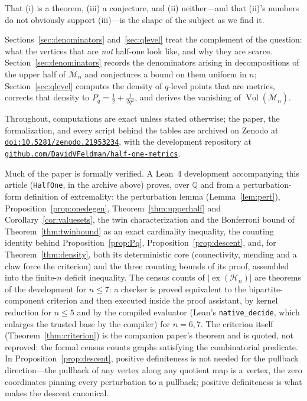 \documentclass[11pt]{article}
\theoremstyle{definition}
\theoremstyle{remark}
\newcommand{\bM}{\bar{\mathcal{M}}}
\newcommand{\Ha}{\mathcal{H}}
\newcommand{\ex}{\operatorname{ex}}
\begin{document}
\smallskip
That (i) is a theorem, (iii) a conjecture, and (ii) neither---and that (ii)'s numbers do
not obviously support (iii)---is the shape of the subject as we find it.

Sections~\ref{sec:denominators} and~\ref{sec:qlevel} treat the complement of the question:
what the vertices that are \emph{not} half-one look like, and why they are scarce.
Section~\ref{sec:denominators} records the denominators arising in decompositions of the
upper half of $\bM_n$ and conjectures a bound on them uniform in $n$;
Section~\ref{sec:qlevel} computes the density of $q$-level points that are metrics,
corrects that density to $P_q=\tfrac12+\tfrac1{2q^2}$, and derives the vanishing of
$\operatorname{Vol}(\bM_n)$.

Throughout, computations are exact unless stated otherwise; the paper, the formalization,
and every script behind the tables are archived on Zenodo at
\href{https://doi.org/10.5281/zenodo.21953234}{\nolinkurl{doi:10.5281/zenodo.21953234}},
with the development repository at
\href{https://github.com/DavidVFeldman/half-one-metrics}{\nolinkurl{github.com/DavidVFeldman/half-one-metrics}}.

Much of the paper is formally verified. A Lean~4 development accompanying this article
(\texttt{HalfOne}, in the archive above) proves, over $\mathbb Q$ and from a
perturbation-form definition of extremality: the perturbation lemma
(Lemma~\ref{lem:pert}), Proposition~\ref{prop:onedegen},
Theorem~\ref{thm:upperhalf} and Corollary~\ref{cor:valuesets}, the twin characterization and the
Bonferroni bound of Theorem~\ref{thm:twinbound} as an exact cardinality inequality, the
counting identity behind Proposition~\ref{prop:Pq}, Proposition~\ref{prop:descent}, and,
for Theorem~\ref{thm:density}, both its deterministic core (connectivity, mending and a
claw force the criterion) and the three counting bounds of its proof, assembled into the
finite-$n$ deficit inequality. The census counts of $|\ex(\Ha_n)|$ are theorems of the
development for $n\leq7$: a checker is proved equivalent to the bipartite-component
criterion and then executed inside the proof assistant, by kernel reduction for $n\leq5$
and by the compiled evaluator (Lean's \texttt{native\_decide}, which enlarges the trusted
base by the compiler) for $n=6,7$. The criterion itself
(Theorem~\ref{thm:criterion}) is the companion paper's theorem and is quoted, not
reproved: the formal census counts graphs satisfying the combinatorial predicate. In
Proposition~\ref{prop:descent}, positive definiteness is not needed for the pullback
direction---the pullback of any vertex along any quotient map is a vertex, the zero
coordinates pinning every perturbation to a pullback; positive definiteness is what makes
the descent canonical.
\end{document}

